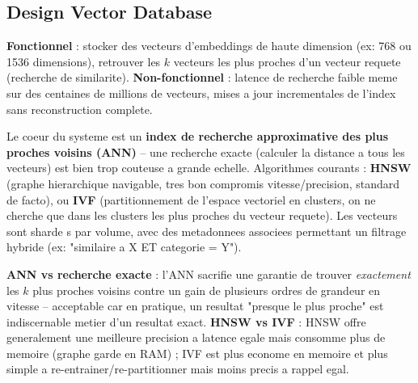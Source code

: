 \documentclass[11pt,a4paper]{article}
\newenvironment{sujet}[1]{%
  \subsection{#1}
}{%
  \bigskip
}
\begin{document}
\begin{sujet}{Design Vector Database}

\begin{req}
\textbf{Fonctionnel} : stocker des vecteurs d'embeddings de haute dimension (ex: 768 ou 1536 dimensions), retrouver les $k$ vecteurs les plus proches d'un vecteur requete (recherche de similarite). \textbf{Non-fonctionnel} : latence de recherche faible meme sur des centaines de millions de vecteurs, mises a jour incrementales de l'index sans reconstruction complete.
\end{req}

\begin{archbox}
Le coeur du systeme est un \textbf{index de recherche approximative des plus proches voisins (ANN)} -- une recherche exacte (calculer la distance a tous les vecteurs) est bien trop couteuse a grande echelle. Algorithmes courants : \textbf{HNSW} (graphe hierarchique navigable, tres bon compromis vitesse/precision, standard de facto), ou \textbf{IVF} (partitionnement de l'espace vectoriel en clusters, on ne cherche que dans les clusters les plus proches du vecteur requete). Les vecteurs sont sharde s par volume, avec des metadonnees associees permettant un filtrage hybride (ex: "similaire a X ET categorie = Y").
\end{archbox}

\begin{tradeoff}
\textbf{ANN vs recherche exacte} : l'ANN sacrifie une garantie de trouver \emph{exactement} les $k$ plus proches voisins contre un gain de plusieurs ordres de grandeur en vitesse -- acceptable car en pratique, un resultat "presque le plus proche" est indiscernable metier d'un resultat exact. \textbf{HNSW vs IVF} : HNSW offre generalement une meilleure precision a latence egale mais consomme plus de memoire (graphe garde en RAM) ; IVF est plus econome en memoire et plus simple a re-entrainer/re-partitionner mais moins precis a rappel egal.
\end{tradeoff}

\end{sujet}
\end{document}
